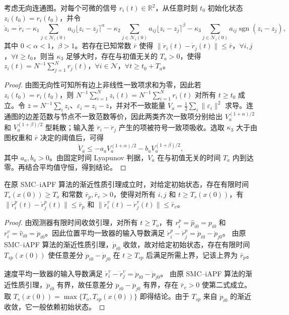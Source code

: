 \begin{lemma}[动态平均一致]
考虑无向连通图。对每个可微的信号 $r_i(t)\in\mathbb{R}^2$，从任意时刻 $t_0$ 初始化状态 $z_i(t_0)=r_i(t_0)$，并令
$$
\dot z_i=\dot r_i
-\kappa_{1}\sum_{j\in\mathcal{N}_i(0)}a_{ij}\lfloor z_i-z_j\rceil^{\alpha}
-\kappa_{2}\sum_{j\in\mathcal{N}_i(0)}a_{ij}\lfloor z_i-z_j\rceil^{\beta}
-\kappa_{3}\sum_{j\in\mathcal{N}_i(0)}a_{ij}\operatorname{sgn}(z_i-z_j),
$$
其中 $0<\alpha<1$，$\beta>1$。若存在已知常数 $\bar r$ 使得 $\|\dot r_i(t)-\dot r_j(t)\|\leq\bar r$，$\forall i,j$，$\forall t\geq t_0$，则当 $\kappa_3$ 足够大时，存在与初值无关的 $T_a>0$，使得 $z_i(t)=N^{-1}\sum_{j=1}^{N}r_j(t)$，$\forall i\in\mathcal{N}$，$\forall t\geq t_0+T_a$。
\end{lemma}

\begin{proof}
由图无向性可知所有边上非线性一致项求和为零，因此若 $z_i(t_0)=r_i(t_0)$，则 $N^{-1}\sum_{i=1}^{N}z_i(t)=N^{-1}\sum_{i=1}^{N}r_i(t)$ 对所有 $t\geq t_0$ 成立。令 $\bar z=N^{-1}\sum_i z_i$、$\varepsilon_i=z_i-\bar z$，并对不一致能量 $V_a=\frac{1}{2}\sum_i\|\varepsilon_i\|^2$ 求导。连通图的边差范数与节点不一致范数等价，因此两类齐次一致项分别给出 $V_a^{(1+\alpha)/2}$ 和 $V_a^{(1+\beta)/2}$ 型耗散；输入差 $\dot r_i-\dot r_j$ 产生的项被符号一致项吸收。选取 $\kappa_3$ 大于由图权重和 $\bar r$ 决定的阈值后，可得
$$
\dot V_a\leq
-a_a V_a^{(1+\alpha)/2}
-b_a V_a^{(1+\beta)/2},
$$
其中 $a_a,b_a>0$。由固定时间 Lyapunov 判据，$V_a$ 在与初值无关的时间 $T_a$ 内到达零。再结合平均值守恒，得到结论。
\end{proof}

\begin{lemma}[动态平均输入有界性]
在原 SMC--iAPF 算法的渐近性质引理成立时，对给定初始状态，存在有限时间 $T_s(x(0))\geq T_o$ 和常数 $\bar r_p,\bar r_v>0$，使得对所有 $i,j$ 和 $t\geq T_s(x(0))$，有 $\|\dot r_i^p(t)-\dot r_j^p(t)\|\leq\bar r_p$ 和 $\|\dot r_i^v(t)-\dot r_j^v(t)\|\leq\bar r_v$。
\end{lemma}

\begin{proof}
由观测器有限时间收敛引理，对所有 $t\geq T_o$，有 $r_i^p=\hat p_{i0}=p_{i0}$ 和 $r_i^v=\hat v_{i0}=\dot p_{i0}$。因此位置平均一致器的输入导数满足 $\dot r_i^p-\dot r_j^p=\dot p_{i0}-\dot p_{j0}$。
由原 SMC--iAPF 算法的渐近性质引理，$\dot p_{i0}$ 收敛，故对给定初始状态，存在有限时间 $T_{sp}(x(0))$ 使任意差分 $\dot p_{i0}-\dot p_{j0}$ 在 $t\geq T_{sp}$ 后满足所需上界，记该上界为 $\bar r_p$。

速度平均一致器的输入导数满足 $\dot r_i^v-\dot r_j^v=\ddot p_{i0}-\ddot p_{j0}$。
由原 SMC--iAPF 算法的渐近性质引理，$\ddot p_{i0}$ 有界，故任意差分 $\ddot p_{i0}-\ddot p_{j0}$ 有界，存在 $\bar r_v>0$ 使第二式成立。取 $T_s(x(0))=\max\{T_o,T_{sp}(x(0))\}$ 即得结论。由于 $T_{sp}$ 来自 $\dot p_{i0}$ 的渐近收敛，它一般依赖初始状态。
\end{proof}

